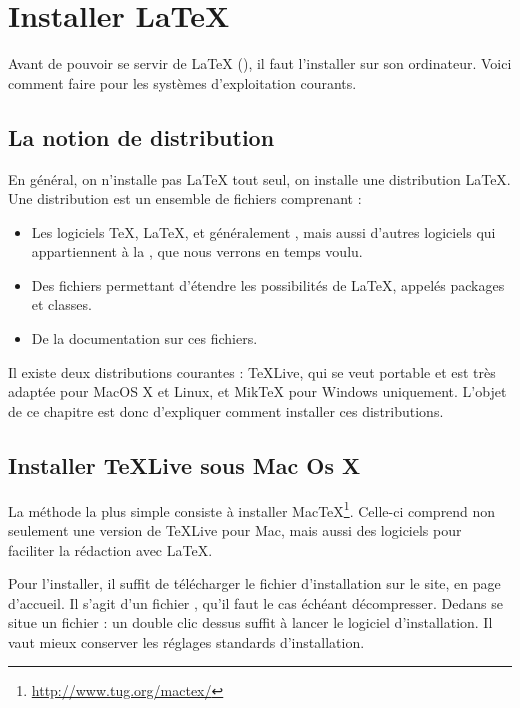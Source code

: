 \chapter {Installer \LaTeX{}}\label{install}

\begin{intro}
    Avant de pouvoir se servir de \LaTeX{} (\XeLaTeX), il faut l'installer sur son ordinateur. Voici comment faire pour les systèmes d'exploitation courants.
\end{intro}

\section{La notion de distribution}

En général, on n'installe pas \LaTeX{} tout seul, on installe une distribution \LaTeX{}. Une distribution est un ensemble de fichiers comprenant :
\begin{itemize}
\item Les logiciels \TeX, \LaTeX, et généralement \XeLaTeX, mais aussi d'autres logiciels qui appartiennent à la  , que nous verrons en temps voulu.
\item Des fichiers permettant d'étendre les possibilités de \LaTeX, appelés packages et classes.
\item De la documentation sur ces fichiers.
\end{itemize}

Il existe deux distributions courantes : TeXLive, qui se veut portable et est très adaptée  pour MacOS X et Linux, et MikTeX pour Windows uniquement. L'objet de ce chapitre est donc d'expliquer comment installer ces distributions.

\section{Installer TeXLive sous Mac Os X}

La méthode la plus simple consiste à installer MacTeX\footnote{\url{http://www.tug.org/mactex/}}. Celle-ci comprend non seulement une version de TeXLive pour Mac, mais aussi des logiciels pour faciliter la rédaction avec \LaTeX{}.

Pour l'installer, il suffit de télécharger le fichier d'installation sur le site, en page d'accueil. Il s'agit d'un fichier , qu'il faut le cas échéant décompresser. Dedans se situe un fichier  : un double clic dessus suffit à lancer le logiciel d'installation. Il vaut mieux conserver les réglages standards d'installation.

